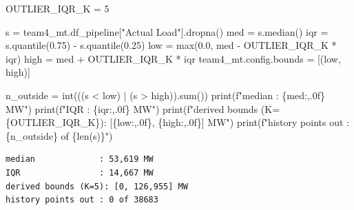 \documentclass[
  english,
  letterpaper,
]{scrbook}
\newenvironment{Shaded}{\begin{snugshade}}{\end{snugshade}}
\newcommand{\BuiltInTok}[1]{\textcolor[rgb]{0.00,0.23,0.31}{#1}}
\newcommand{\DecValTok}[1]{\textcolor[rgb]{0.68,0.00,0.00}{#1}}
\newcommand{\FloatTok}[1]{\textcolor[rgb]{0.68,0.00,0.00}{#1}}
\newcommand{\NormalTok}[1]{\textcolor[rgb]{0.00,0.23,0.31}{#1}}
\newcommand{\OperatorTok}[1]{\textcolor[rgb]{0.37,0.37,0.37}{#1}}
\newcommand{\SpecialCharTok}[1]{\textcolor[rgb]{0.37,0.37,0.37}{#1}}
\newcommand{\SpecialStringTok}[1]{\textcolor[rgb]{0.13,0.47,0.30}{#1}}
\newcommand{\StringTok}[1]{\textcolor[rgb]{0.13,0.47,0.30}{#1}}
\begin{document}
\protect{}\label{team4-outlier-bounds}
\begin{Shaded}
\begin{Highlighting}[]
\NormalTok{OUTLIER\_IQR\_K }\OperatorTok{=} \DecValTok{5}

\NormalTok{s }\OperatorTok{=}\NormalTok{ team4\_mt.df\_pipeline[}\StringTok{"Actual Load"}\NormalTok{].dropna()}
\NormalTok{med }\OperatorTok{=}\NormalTok{ s.median()}
\NormalTok{iqr }\OperatorTok{=}\NormalTok{ s.quantile(}\FloatTok{0.75}\NormalTok{) }\OperatorTok{{-}}\NormalTok{ s.quantile(}\FloatTok{0.25}\NormalTok{)}
\NormalTok{low }\OperatorTok{=} \BuiltInTok{max}\NormalTok{(}\FloatTok{0.0}\NormalTok{, med }\OperatorTok{{-}}\NormalTok{ OUTLIER\_IQR\_K }\OperatorTok{*}\NormalTok{ iqr)}
\NormalTok{high }\OperatorTok{=}\NormalTok{ med }\OperatorTok{+}\NormalTok{ OUTLIER\_IQR\_K }\OperatorTok{*}\NormalTok{ iqr}
\NormalTok{team4\_mt.config.bounds }\OperatorTok{=}\NormalTok{ [(low, high)]}

\NormalTok{n\_outside }\OperatorTok{=} \BuiltInTok{int}\NormalTok{(((s }\OperatorTok{\textless{}}\NormalTok{ low) }\OperatorTok{|}\NormalTok{ (s }\OperatorTok{\textgreater{}}\NormalTok{ high)).}\BuiltInTok{sum}\NormalTok{())}
\BuiltInTok{print}\NormalTok{(}\SpecialStringTok{f"median             : }\SpecialCharTok{\{}\NormalTok{med}\SpecialCharTok{:,.0f\}}\SpecialStringTok{ MW"}\NormalTok{)}
\BuiltInTok{print}\NormalTok{(}\SpecialStringTok{f"IQR                : }\SpecialCharTok{\{}\NormalTok{iqr}\SpecialCharTok{:,.0f\}}\SpecialStringTok{ MW"}\NormalTok{)}
\BuiltInTok{print}\NormalTok{(}\SpecialStringTok{f"derived bounds (K=}\SpecialCharTok{\{}\NormalTok{OUTLIER\_IQR\_K}\SpecialCharTok{\}}\SpecialStringTok{): [}\SpecialCharTok{\{}\NormalTok{low}\SpecialCharTok{:,.0f\}}\SpecialStringTok{, }\SpecialCharTok{\{}\NormalTok{high}\SpecialCharTok{:,.0f\}}\SpecialStringTok{] MW"}\NormalTok{)}
\BuiltInTok{print}\NormalTok{(}\SpecialStringTok{f"history points out : }\SpecialCharTok{\{}\NormalTok{n\_outside}\SpecialCharTok{\}}\SpecialStringTok{ of }\SpecialCharTok{\{}\BuiltInTok{len}\NormalTok{(s)}\SpecialCharTok{\}}\SpecialStringTok{"}\NormalTok{)}
\end{Highlighting}
\end{Shaded}

\begin{verbatim}
median             : 53,619 MW
IQR                : 14,667 MW
derived bounds (K=5): [0, 126,955] MW
history points out : 0 of 38683
\end{verbatim}
\end{document}

